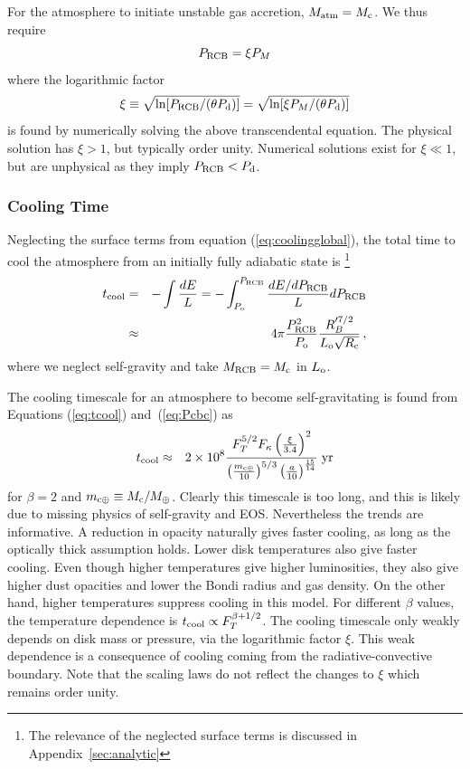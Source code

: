 \documentclass[apj]{emulateapj}
\newcommand{\yr}{\; {\rm yr}}
\newcommand{\Eqs}[2]{Equations (\ref{#1}) and~(\ref{#2})}
\newcommand{\App}[1]{Appendix~\ref{#1}}
\newcommand{\co}{_{\rm c}}
\newcommand{\di}{_{\rm o}}
\newcommand{\cb}{_{\rm RCB}}
\newcommand{\mc}{m_{\rm c \oplus}}
\begin{document}
For the atmosphere to initiate unstable gas accretion, $M_{\rm atm} = M\co$. We thus require
\begin{equation} \label{eq:Pcbc}
P\cb = \xi P_M
\end{equation} 
where  the logarithmic factor
\begin{equation}\label{eq:xi}
\xi \equiv \sqrt{\ln[ P\cb/(\theta P_{\rm d})]} = \sqrt{\ln[ \xi P_M / (\theta P_{\rm d})]}
\end{equation} 
is found by numerically solving the above transcendental equation. The physical solution has $\xi >1$, but typically order unity. Numerical solutions exist for $\xi \ll 1$, but are unphysical as they imply $P\cb < P_{\rm d}$.

\subsubsection{Cooling Time}
Neglecting the surface terms from equation (\ref{eq:coolingglobal}), the total time to cool the atmosphere from an initially fully adiabatic state is \footnote{The relevance of the neglected surface terms is discussed in \App{sec:analytic}}
\begin{eqnarray} 
t_{\rm  cool} &=& -\int {d E \over L} = - \int_{P\di}^{P\cb } {d E/d P\cb \over L} dP\cb \\
&\approx& 4 \pi {P\cb^{2} \over P\di} {R_B'^{7/2} \over L\di \sqrt{R\co}} \label{eq:tcool}\, ,
\end{eqnarray} 
where we neglect self-gravity and take $M\cb = M\co$ in $L\di$.

The cooling timescale  for an atmosphere to become self-gravitating is found from \Eqs{eq:tcool}{eq:Pcbc} as
\begin{eqnarray} 
\label{eq:tcoolan}
t_{\rm cool} &\approx & 2 \times 10^8 {F_T^{5/2}  F_\kappa \left(\xi \over 3.4\right)^2  \over \left(\mc \over 10 \right)^{5/3} \left(a\over 10\right)^{15 \over 14}} \yr
\end{eqnarray} 
for $\beta = 2$ and $\mc \equiv M_{\rm c} / M_{\oplus}$.  
Clearly this timescale is too long, and this is likely due to missing physics of self-gravity and EOS.  Nevertheless the trends are informative.   A reduction in opacity naturally gives faster cooling, as long as the optically thick assumption holds.  Lower disk temperatures also give faster cooling.  Even though higher temperatures give higher luminosities, they also give higher dust opacities and lower the Bondi radius and gas density.  On the other hand,  higher temperatures suppress cooling in this model.    For different $\beta$ values, the temperature dependence is $t_{\rm cool} \propto F_T^{ \beta + 1/2}$.  The cooling timescale only weakly depends on disk mass or pressure, via the  logarithmic factor $\xi$.  This weak dependence is a consequence of cooling coming from the radiative-convective boundary.  Note that the scaling laws do not reflect the changes to $\xi$ which remains order unity. %
\end{document}
